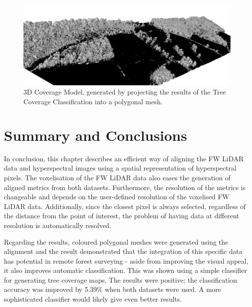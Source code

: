 \documentclass{subfiles}
\begin{document}
\begin{figure} [h!]
	\centering
	\includegraphics[width=\textwidth]{img/CoverageProjected}
	\caption[3D Coverage Model]{3D Coverage Model, generated by projecting the results of the Tree Coverage Classification into a polygonal mesh.}
	\label{fig:CoverageProjectedPolygon}
\end{figure}

\newpage\newpage
\section {Summary and Conclusions}
\par In conclusion, this chapter describes an efficient way of aligning the FW LiDAR data and hyperspectral images using a spatial representation of hyperspectral pixels. The voxelisation of the FW LiDAR data also eases the generation of aligned metrics from both datasets. Furthermore, the resolution of the metrics is changeable and depends on the user-defined resolution of the voxelised FW LiDAR data. Additionally, since the closest pixel is always selected, regardless of the distance from the point of interest, the problem of having data at different resolution is automatically resolved. 

\par Regarding the results, coloured polygonal meshes were generated using the alignment and the result demonstrated that the integration of this specific data has potential in remote forest surveying - aside from improving the visual appeal, it also improves automatic classification. This was shown using a simple classifier for generating tree coverage maps. The results were positive; the classification accuracy was improved by 5.39\% when both datasets were used.  A more sophisticated classifier would likely give even better results.
\end{document}
